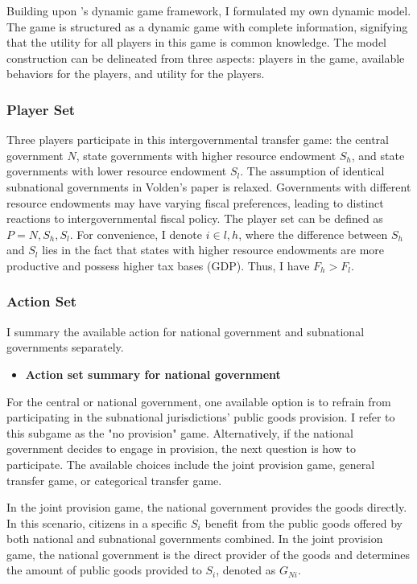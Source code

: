 \documentclass[man]{apa7}
\begin{document}
Building upon \Textcite{volden2007intergovernmental}'s dynamic game framework, I formulated my own dynamic model. The game is structured as a dynamic game with complete information, signifying that the utility for all players in this game is common knowledge. The model construction can be delineated from three aspects: players in the game, available behaviors for the players, and utility for the players.

\subsubsection{Player Set}

Three players participate in this intergovernmental transfer game: the central government $N$, state governments with higher resource endowment $S_h$, and state governments with lower resource endowment $S_l$. The assumption of identical subnational governments in Volden's paper is relaxed. Governments with different resource endowments may have varying fiscal preferences, leading to distinct reactions to intergovernmental fiscal policy. The player set can be defined as $P = { N, S_h, S_l}$. For convenience, I denote $i\in {l,h}$, where the difference between $S_h$ and $S_l$ lies in the fact that states with higher resource endowments are more productive and possess higher tax bases (GDP). Thus, I have $F_h>F_l$.%

\subsubsection{Action Set}
I summary the available action for national government and subnational governments separately.

\begin{itemize}
  \item \textbf{Action set summary for national government}
\end{itemize}

For the central or national government, one available option is to refrain from participating in the subnational jurisdictions' public goods provision. I refer to this subgame as the "no provision" game. Alternatively, if the national government decides to engage in provision, the next question is how to participate. The available choices include the joint provision game, general transfer game, or categorical transfer game.

In the joint provision game, the national government provides the goods directly. In this scenario, citizens in a specific $S_i$ benefit from the public goods offered by both national and subnational governments combined. In the joint provision game, the national government is the direct provider of the goods and determines the amount of public goods provided to $S_i$, denoted as $G_{Ni}$.%
\end{document}
